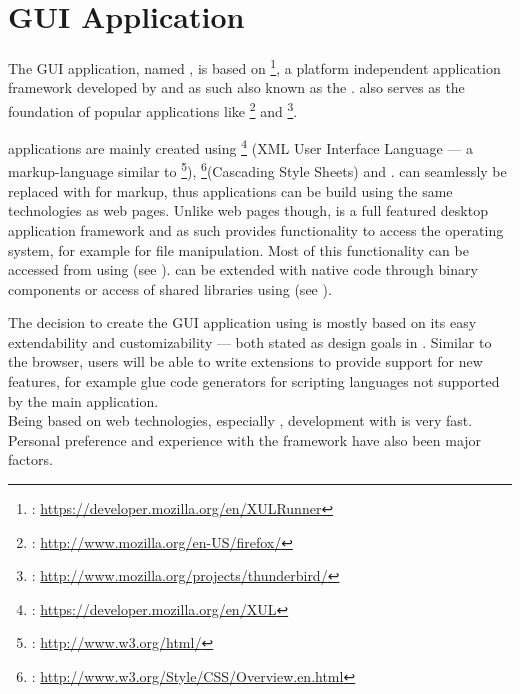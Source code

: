 \chapter{GUI Application}
\label{chap:GUIApplication}

The GUI application, named , is based on \footnote{: \url{https://developer.mozilla.org/en/XULRunner}}, a \linebreak platform independent application framework developed by  and as such also known as the .  also serves as the foundation of popular applications like \footnote{: \url{http://www.mozilla.org/en-US/firefox/}} and \footnote{: \url{http://www.mozilla.org/projects/thunderbird/}}. 

 applications are mainly created using \footnote{: \url{https://developer.mozilla.org/en/XUL}} (XML User Interface \linebreak Language --- a markup-language similar to \footnote{: \url{http://www.w3.org/html/}}), \footnote{: \url{http://www.w3.org/Style/CSS/Overview.en.html}}(Cascading Style Sheets) and .  can seamlessly be replaced with  for markup, thus  applications can be build using the same technologies as web pages. Unlike web pages though,  is a full featured desktop application framework and as such provides functionality to access the operating system, for example for file manipulation. Most of this functionality can be accessed from  using  (see ).  can be extended with native code through  binary components or access of shared libraries using  (see ).

The decision to create the GUI application using  is mostly based on its easy extendability and customizability --- both stated as design goals in . Similar to the  browser, users will be able to write extensions to provide support for new features, for example glue code generators for scripting languages not supported by the main application.\\
Being based on web technologies, especially , development with  \linebreak{} is very fast.
\\Personal preference and experience with the framework have also been major factors.

